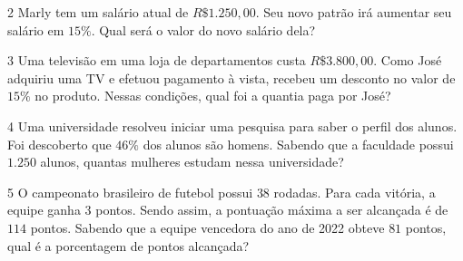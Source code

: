 \num{2} Marly tem um salário atual de $R\$ 1.250,00$. Seu novo patrão irá
aumentar seu salário em $15\%$. Qual será o valor do novo salário dela?


\num{3} Uma televisão em uma loja de departamentos custa $R\$ 3.800,00$.
Como José adquiriu uma TV e efetuou pagamento à vista, recebeu um
desconto no valor de $15\%$ no produto. Nessas condições, qual foi a
quantia paga por José?


\num{4} Uma universidade resolveu iniciar uma pesquisa para saber o perfil
dos alunos. Foi descoberto que $46\%$ dos alunos são homens. Sabendo
que a faculdade possui $1.250$ alunos, quantas mulheres estudam nessa
universidade?








\num{5} O campeonato brasileiro de futebol possui $38$ rodadas. Para cada
vitória, a equipe ganha $3$ pontos. Sendo assim, a pontuação máxima a ser
alcançada é de $114$ pontos. Sabendo que a equipe vencedora do ano de 2022
obteve $81$ pontos, qual é a porcentagem de pontos alcançada?







